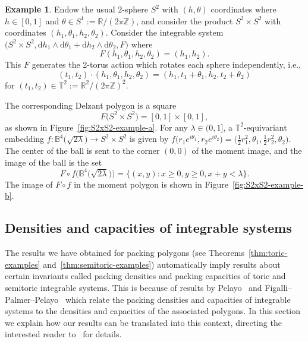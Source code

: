 \documentclass[10pt,a4paper]{amsart}
\numberwithin{equation}{section}
\def\R{{\mathbb R}}
\def\Z{{\mathbb Z}}
\theoremstyle{definition}
\newtheorem{example}[Theorem]{Example}
\theoremstyle{plain}
\theoremstyle{plain}
\begin{document}
\begin{example}
Endow the usual $2$-sphere $S^2$ with $(h,\theta)$ coordinates where $h\in [0,1]$ and $\theta\in S^1 := \R/ (2\pi \Z)$,
and consider the product $S^2\times S^2$ with coordinates $(h_1, \theta_1, h_2, \theta_2)$.
Consider the integrable system $\big(S^2 \times S^2, \mathrm{d} h_1 \wedge \mathrm{d} \theta_1 + \mathrm{d} h_2 \wedge \mathrm{d}\theta_2, F\big)$ where
\[
 F(h_1, \theta_1, h_2, \theta_2) = (h_1,h_2).
\]
This $F$ generates the 2-torus action which rotates each sphere independently, i.e.,
\[(t_1,t_2) \cdot (h_1, \theta_1, h_2, \theta_2) = (h_1,t_1+ \theta_1, h_2, t_2 +\theta_2) \]
for $(t_1,t_2)\in\mathbb{T}^2:= \R^2/(2\pi \mathbb{Z})^2$.



The corresponding Delzant polygon is a square
\[F\big(S^2\times S^2\big) = [0, 1] \times [0,1],\]
as shown in Figure~\ref{fig:S2xS2-example-a}.
For any $\lambda\in(0,1]$, a $\mathbb{T}^2$-equivariant embedding $f\colon \mathbb{B}^4\big(\sqrt{2\lambda}\big)\to S^2\times S^2$
is given by $f\big(r_1e^{i\theta_1},r_2e^{i\theta_2}\big) = \big(\frac{1}{2}r_1^2, \theta_1, \frac{1}{2}r_2^2, \theta_2\big)$.
The center of the ball is sent to the corner $(0,0)$ of the moment image, and the image of the ball is the set
\[F\circ f\big(\mathbb{B}^4\big(\sqrt{2\lambda}\big)\big) = \{(x,y)\colon x \geq 0, y \geq 0, x+y < \lambda\}.\]
The image of $F\circ f$ in the moment polygon is shown in Figure~\ref{fig:S2xS2-example-b}.
\end{example}

\subsection{Densities and capacities of integrable systems}
\label{sec:capacities}






The results we have obtained for packing polygons (see Theorems~\ref{thm:toric-examples} and~\ref{thm:semitoric-examples}) automatically imply results about certain invariants called packing densities and packing capacities of toric and semitoric integrable systems.
This is because of results by Pelayo~\cite{Pe2006} and Figalli--Palmer--Pelayo~\cite{FiPaPe2016} which relate the packing densities and capacities of integrable systems to the densities and capacities of the associated polygons.
In this section we explain how our results can be translated into this context, directing the interested reader to~\cite{FiPaPe2016} for details.
\end{document}
